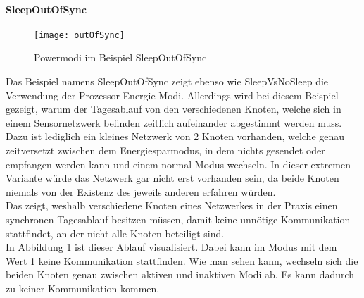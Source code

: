 \paragraph{SleepOutOfSync}

\begin{figure}[htbp]
\centering
\caption{Powermodi im Beispiel SleepOutOfSync}
\label{fig:sleepOutOfSyncModes}
\texttt{[image: outOfSync]}
\end{figure}

Das Beispiel namens SleepOutOfSync zeigt ebenso wie SleepVsNoSleep die Verwendung der Prozessor-Energie-Modi. Allerdings wird bei diesem Beispiel gezeigt, warum der Tagesablauf von den verschiedenen Knoten, welche sich in einem Sensornetzwerk befinden zeitlich aufeinander abgestimmt werden muss.\\
Dazu ist lediglich ein kleines Netzwerk von 2 Knoten vorhanden, welche genau zeitversetzt zwischen dem Energiesparmodus, in dem nichts gesendet oder empfangen werden kann und einem normal Modus wechseln. In dieser extremen Variante würde das Netzwerk gar nicht erst vorhanden sein, da beide Knoten niemals von der Existenz des jeweils anderen erfahren würden.\\
Das zeigt, weshalb verschiedene Knoten eines Netzwerkes in der Praxis einen synchronen Tagesablauf besitzen müssen, damit keine unnötige Kommunikation stattfindet, an der nicht alle Knoten beteiligt sind.\\
In Abbildung \ref{fig:sleepOutOfSyncModes} ist dieser Ablauf visualisiert. Dabei kann im Modus mit dem Wert 1 keine Kommunikation stattfinden. Wie man sehen kann, wechseln sich die beiden Knoten genau zwischen aktiven und inaktiven Modi ab. Es kann dadurch zu keiner Kommunikation kommen.